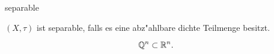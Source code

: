 \documentclass[class=article, crop=false]{standalone}
\begin{document}
\begin{zettel}{separable}
\begin{flashcard}[]{}
	\begin{definition}[separable]
		$(X ,\tau )$ ist separable, falls es eine abz"ahlbare dichte Teilmenge besitzt.
	\end{definition}
\end{flashcard}
\begin{example}
	\[
		\mathbb{Q}^n \subset \mathbb{R}^n
	.\]
\end{example}
\end{zettel}
\end{document}
